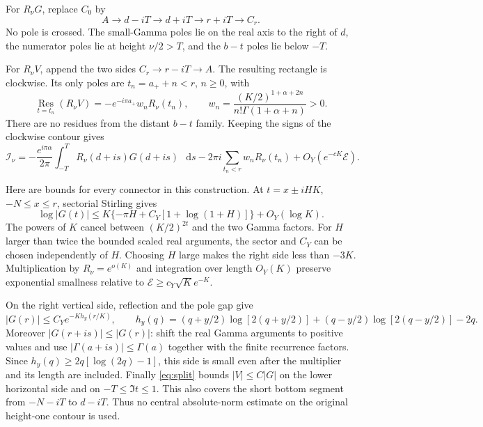 \documentclass[11pt,a4paper]{article}
\newcommand{\dd}{\mathop{}\!\mathrm d}
\newcommand{\E}{\mathcal E}
\begin{document}
For \(R_\nu G\), replace \(C_0\) by
\[
 A\longrightarrow d-iT\longrightarrow d+iT
 \longrightarrow r+iT\longrightarrow C_r.
\]
No pole is crossed. The small-Gamma poles lie on the real axis to
the right of \(d\), the numerator poles lie at height \(\nu/2>T\),
and the \(b-t\) poles lie below \(-T\).

For \(R_\nu V\), append the two sides
\(C_r\to r-iT\to A\). The resulting rectangle is clockwise.
Its only poles are \(t_n=a_++n<r\), \(n\ge0\), with
\[
 \operatorname*{Res}_{t=t_n}(R_\nu V)
 =-e^{-i\pi a_+}w_nR_\nu(t_n),\qquad
 w_n=\frac{(K/2)^{1+\alpha+2n}}{n!\Gamma(1+\alpha+n)}>0.
\]
There are no residues from the distant \(b-t\) family.
Keeping the signs of the clockwise contour gives
\begin{equation}\label{eq:branches}
 \mathcal I_\nu=
 -\frac{e^{i\pi\alpha}}{2\pi}
      \int_{-T}^{T}R_\nu(d+is)G(d+is)\,\dd s
 -2\pi i\sum_{t_n<r}w_nR_\nu(t_n)
 +O_Y(e^{-cK}\E).
\end{equation}

Here are bounds for every connector in this construction.
At \(t=x\pm iHK\), \(-N\le x\le r\), sectorial Stirling gives
\[
 \log|G(t)|
 \le K\{-\pi H+C_Y[1+\log(1+H)]\}+O_Y(\log K).
\]
The powers of \(K\) cancel between \((K/2)^{2t}\) and the two
Gamma factors. For \(H\) larger than twice the bounded scaled real
arguments, the sector and \(C_Y\) can be chosen independently of \(H\).
Choosing \(H\) large makes the right side less than
\(-3K\). Multiplication by \(R_\nu=e^{o(K)}\) and integration over
length \(O_Y(K)\) preserve exponential smallness relative to
\(\E\ge c_Y\sqrt K e^{-K}\).

On the right vertical side, reflection and the pole gap give
\[
 |G(r)|\le C_Ye^{-Kh_y(r/K)},\qquad
 h_y(q)=(q+y/2)\log[2(q+y/2)]
       +(q-y/2)\log[2(q-y/2)]-2q.
\]
Moreover \(|G(r+is)|\le|G(r)|\): shift the real Gamma arguments
to positive values and use
\(|\Gamma(a+is)|\le\Gamma(a)\) together with the finite recurrence
factors. Since \(h_y(q)\ge2q[\log(2q)-1]\), this side is small
even after the multiplier and its length are included.
Finally \eqref{eq:split} bounds \(|V|\le C|G|\) on the lower
horizontal side and on \(-T\le\Im t\le1\).
This also covers the short bottom segment from \(-N-iT\) to \(d-iT\).
Thus no central absolute-norm estimate on the original height-one
contour is used.
\end{document}
